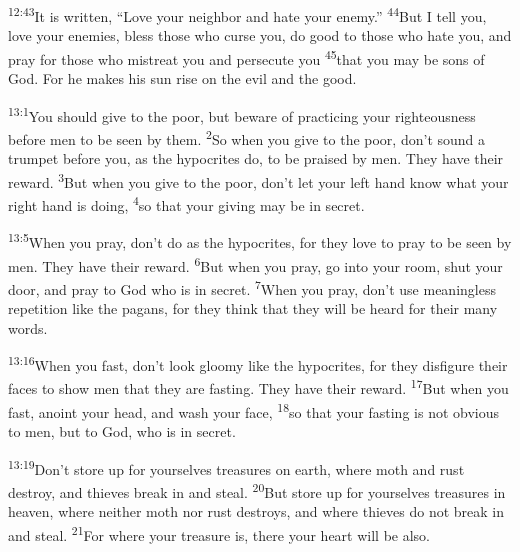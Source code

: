\documentclass[openany,12pt,english]{book}
\newenvironment{para}{\par\pretolerance=100\tolerance=200\setlength{\emergencystretch}{0.6em}\relax}{\par}
\begin{document}
\begin{para}
    \textsuperscript{12:43}\thinspace{}It is writ\-ten, “Love your neigh\-bor and hate your en\-e\-my.”
    \textsuperscript{44}\thinspace{}But I tell you, love your enemies, bless those who curse you, do good to those who hate you, and pray for those who mis\-treat you and per\-se\-cute you
    \textsuperscript{45}\thinspace{}that you may be sons of God. For he makes his sun rise on the evil and the good.
\end{para}

\begin{para}
    \textsuperscript{13:1}\thinspace{}You should give to the poor, but be\-ware of prac\-tic\-ing your right\-eous\-ness be\-fore men to be seen by them.
    \textsuperscript{2}\thinspace{}So when you give to the poor, don't sound a trum\-pet be\-fore you, as the hypocrites do, to be praised by men. They have their re\-ward.
    \textsuperscript{3}\thinspace{}But when you give to the poor, don't let your left hand know what your right hand is do\-ing,
    \textsuperscript{4}\thinspace{}so that your giv\-ing may be in se\-cret.
\end{para}

\begin{para}
    \textsuperscript{13:5}\thinspace{}When you pray, don't do as the hypocrites, for they love to pray to be seen by men. They have their re\-ward.
    \textsuperscript{6}\thinspace{}But when you pray, go in\-to your room, shut your door, and pray to God who is in se\-cret.
    \textsuperscript{7}\thinspace{}When you pray, don't use mean\-ing\-less rep\-e\-ti\-tion like the pagans, for they think that they will be heard for their man\-y words.
\end{para}

\begin{para}
    \textsuperscript{13:16}\thinspace{}When you fast, don't look gloom\-y like the hypocrites, for they dis\-fig\-ure their faces to show men that they are fasting. They have their re\-ward.
    \textsuperscript{17}\thinspace{}But when you fast, a\-noint your head, and wash your face,
    \textsuperscript{18}\thinspace{}so that your fasting is not ob\-vi\-ous to men, but to God, who is in se\-cret.
\end{para}

\begin{para}
    \textsuperscript{13:19}\thinspace{}Don't store up for your\-selves treasures on earth, where moth and rust de\-stroy, and thieves break in and steal.
    \textsuperscript{20}\thinspace{}But store up for your\-selves treasures in heav\-en, where nei\-ther moth nor rust destroys, and where thieves do not break in and steal.
    \textsuperscript{21}\thinspace{}For where your treas\-ure is, there your heart will be al\-so.
\end{para}
\end{document}
